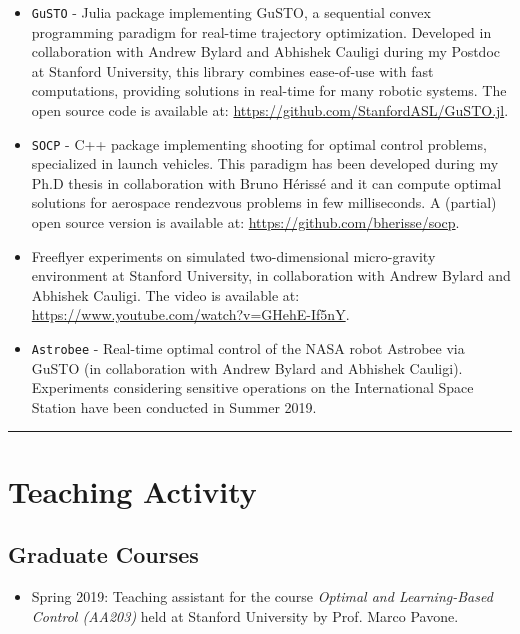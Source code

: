 \documentclass[a4paper,12pt]{article}
\begin{document}
\begin{itemize}
\item \texttt{GuSTO} - Julia package implementing GuSTO, a sequential convex programming paradigm for real-time trajectory optimization. Developed in collaboration with Andrew Bylard and Abhishek Cauligi during my Postdoc at Stanford University, this library combines ease-of-use with fast computations, providing solutions in real-time for many robotic systems. The open source code is available at: \url{https://github.com/StanfordASL/GuSTO.jl}.
\item \texttt{SOCP} - C++ package implementing shooting for optimal control problems, specialized in launch vehicles. This paradigm has been developed during my Ph.D thesis in collaboration with Bruno H\'eriss\'e and it can compute optimal solutions for aerospace rendezvous problems in few milliseconds. A (partial) open source version is available at: \url{https://github.com/bherisse/socp}.
\item Freeflyer experiments on simulated two-dimensional micro-gravity environment at Stanford University, in collaboration with Andrew Bylard and Abhishek Cauligi. The video is available at: \url{https://www.youtube.com/watch?v=GHehE-If5nY}.
\item \texttt{Astrobee} - Real-time optimal control of the NASA robot Astrobee via GuSTO (in collaboration with Andrew Bylard and Abhishek Cauligi). Experiments considering sensitive operations on the International Space Station have been conducted in Summer 2019.
\end{itemize}

\begingroup
\begin{center}
\noindent\rule{7cm}{0.4pt}
\end{center}
\endgroup

\section{Teaching Activity}

\subsection{Graduate Courses}

\begin{itemize}
\item Spring 2019: Teaching assistant for the course \textit{Optimal and Learning-Based Control (AA203)} held at Stanford University by Prof. Marco Pavone.
\end{itemize}
\end{document}
